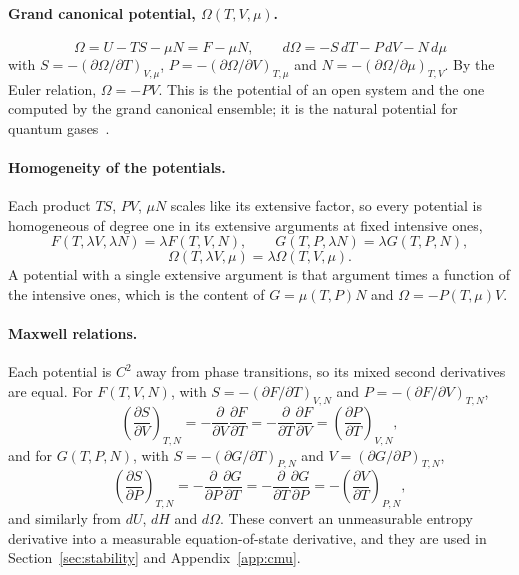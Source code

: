 \documentclass[10pt,a4paper]{article}
\theoremstyle{remark}
\begin{document}
\paragraph{Grand canonical potential, $\Omega(T,V,\mu)$.}
\[
  \;\Omega=U-TS-\mu N=F-\mu N ,\qquad d\Omega=-S\,dT-P\,dV-N\,d\mu\
\]
with $S=-(\partial\Omega/\partial T)_{V,\mu}$, $P=-(\partial\Omega/\partial V)_{T,\mu}$
and $N=-(\partial\Omega/\partial\mu)_{T,V}$. By the Euler relation, $\Omega=-PV$.
This is the potential of an open system and
the one computed by the grand canonical ensemble; it is the natural
potential for quantum gases~\cite{DOSNotes}.

\paragraph{Homogeneity of the potentials.} Each product $TS$, $PV$, $\mu N$
scales like its extensive factor, so every potential is homogeneous of degree
one in its extensive arguments at fixed intensive ones,
\[
  F(T,\lambda V,\lambda N)=\lambda F(T,V,N),\qquad
  G(T,P,\lambda N)=\lambda G(T,P,N),
\]
\[
  \Omega(T,\lambda V,\mu)=\lambda\Omega(T,V,\mu) .
\]
A potential with a single extensive argument is that argument times a function
of the intensive ones, which is the content of $G=\mu(T,P)N$ and
$\Omega=-P(T,\mu)V$.

\paragraph{Maxwell relations.} Each potential is $C^{2}$ away from phase
transitions, so its mixed second derivatives are equal. For $F(T,V,N)$, with
$S=-(\partial F/\partial T)_{V,N}$ and $P=-(\partial F/\partial V)_{T,N}$,
\[
  \left(\frac{\partial S}{\partial V}\right)_{T,N}
  =-\frac{\partial}{\partial V}\frac{\partial F}{\partial T}
  =-\frac{\partial}{\partial T}\frac{\partial F}{\partial V}
  =\left(\frac{\partial P}{\partial T}\right)_{V,N} ,
\]
and for $G(T,P,N)$, with $S=-(\partial G/\partial T)_{P,N}$ and
$V=(\partial G/\partial P)_{T,N}$,
\[
  \left(\frac{\partial S}{\partial P}\right)_{T,N}
  =-\frac{\partial}{\partial P}\frac{\partial G}{\partial T}
  =-\frac{\partial}{\partial T}\frac{\partial G}{\partial P}
  =-\left(\frac{\partial V}{\partial T}\right)_{P,N} ,
\]
and similarly from $dU$, $dH$ and $d\Omega$. These convert an unmeasurable
entropy derivative into a measurable equation-of-state derivative, and they
are used in Section~\ref{sec:stability} and Appendix~\ref{app:cmu}.
\end{document}
